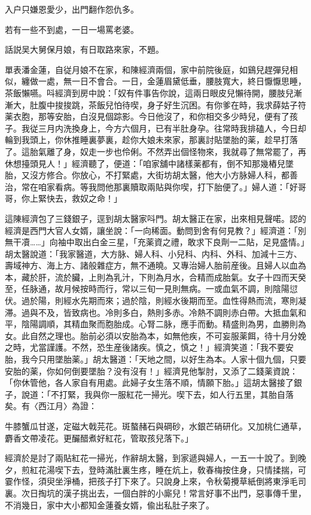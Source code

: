 入户只嫌恩愛少，出門翻作怨仇多。

若有一些不到處，一日一場罵老婆。

話説吴大舅保月娘，有日取路來家，不題。

單表潘金蓮，自従月娘不在家，和陳經濟兩個，家中前院後庭，如鷄兒趕彈兒相似，纏做一處，無一日不會合。一日，金蓮眉黛低垂，腰肢寬大，終日懨懨思睡，茶飯懶嚥。呌經濟到房中說：「奴有件事告你說，這兩日眼皮兒懶待開，腰肢兒漸漸大，肚腹中捘捘跳，茶飯兒怕待喫，身子好生沉困。有你爹在時，我求薛姑子符薬衣胞，那等安胎，白沒見個踪影。今日他沒了，和你相交多少時兒，便有了孩子。我従三月内洗換身上，今方六個月，已有半肚身孕。往常時我排磕人，今日却輪到我頭上，你休推睡裏夢裏，趁你大娘未來家，那裏討貼墜胎的薬，趁早打落了。這胎氣離了身，奴走一步也伶俐。不然弄出個怪物來，我就尋了無常罷了，再休想擡頭見人！」經濟聽了，便道：「咱家舖中諸樣薬都有，倒不知那幾樁兒墜胎，又沒方修合。你放心，不打緊處，大街坊胡太醫，他大小方脉婦人科，都善治，常在咱家看病。等我問他那裏贖取兩貼與你喫，打下胎便了。」婦人道：「好哥哥，你上緊快去，救奴之命！」

這陳經濟包了三錢銀子，逕到胡太醫家呌門。胡太醫正在家，出來相見聲喏。認的經濟是西門大官人女婿，讓坐說：「一向稀面。動問到舍有何見教？」經濟道：「別無干凟……」向袖中取出白金三星，「充薬資之禮，敢求下良劑一二貼，足見盛情。」胡太醫說道：「我家醫道，大方脉、婦人科、小兒科、内科、外科、加減十三方、壽域神方、海上方、諸般雜症方，無不通曉。又專治婦人胎前産後。且婦人以血為本，藏於肝，流於臟，上則為乳汁，下則為月水，合精而成胎氣。女子十四而天癸至，任脉通，故月候按時而行，常以三旬一見則無病。一或血氣不調，則陰陽愆伏。過於陽，則經水先期而來；過於陰，則經水後期而至。血性得熱而流，寒則凝滞。過與不及，皆致病也。冷則多白，熱則多赤。冷熱不調則赤白帶。大抵血氣和平，陰陽調順，其精血聚而胞胎成。心腎二脉，應手而動。精盛則為男，血勝則為女。此自然之理也。胎前必須以安胎為本，如無他疾，不可妄服薬餌，待十月分娩之時，尤當謹護。不然，恐生産後諸疾。慎之，慎之！」經濟笑道：「我不要安胎，我今只用墜胎薬。」胡太醫道：「天地之間，以好生為本。人家十個九個，只要安胎的薬，你如何倒要墜胎？没有沒有！」經濟見他掣肘，又添了二錢薬資說：「你休管他，各人家自有用處。此婦子女生落不順，情願下胎。」這胡太醫接了銀子，說道：「不打緊，我與你一服紅花一掃光。喫下去，如人行五里，其胎自落矣。有〈西江月〉為證：

牛膝蟹瓜甘遂，定磁大戟芫花。斑螯赭石與碙砂，水銀芒硝研化。又加桃仁通草，麝香文帶凌花。更釅醋煮好紅花，管取孩兒落下。」

經濟於是討了兩貼紅花一掃光，作辭胡太醫，到家遞與婦人，一五一十說了。到晚夕，煎紅花湯喫下去，登時滿肚裏生疼，睡在炕上，敎春梅按住身，只情揉揣，可霎作怪，須臾坐淨桶，把孩子打下來了。只說身上來，令秋菊攪草紙倒將東淨毛司裏。次日掏坑的漢子挑出去，一個白胖的小廝兒！常言好事不出門，惡事傳千里，不消幾日，家中大小都知金蓮養女婿，偸出私肚子來了。

